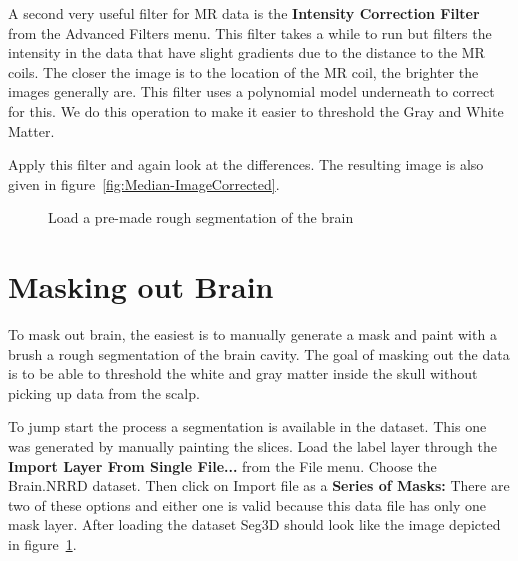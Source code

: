 \documentclass[fleqn,11pt,openany]{book}
\begin{document}
A second very useful filter for MR data is the {\bf Intensity Correction Filter} from the Advanced Filters menu. This filter takes a while to run  but filters the intensity in the data that have slight gradients due to the distance to the MR coils. The closer the image is to the location of the MR coil, the brighter the images generally are. This filter uses a polynomial model underneath to correct for this. We do this operation to make it easier to threshold the Gray and White Matter.

Apply this filter and again look at the differences. The resulting image is also given in figure~\ref{fig:Median-ImageCorrected}. 

\begin{figure}
\caption{Load a pre-made rough segmentation of the brain}\label{fig:LoadingSegmentation}
\end{figure}


\section{Masking out Brain}

To mask out brain, the easiest is to manually generate a mask and paint with a brush a rough segmentation of the brain cavity. The goal of masking out the data is to be able to threshold the white and gray matter inside the skull without picking up data from the scalp.

To jump start the process a segmentation is available in the dataset. This one was generated by manually painting the slices. Load the label layer through the {\bf Import Layer From Single File...} from the  File menu. Choose the Brain.NRRD dataset.  Then click on Import file as a {\bf Series of Masks:} There are two of these options and either one is valid because this data file has only one mask layer.  After loading the dataset Seg3D should look like the image depicted in figure~\ref{fig:LoadingSegmentation}.
\end{document}
